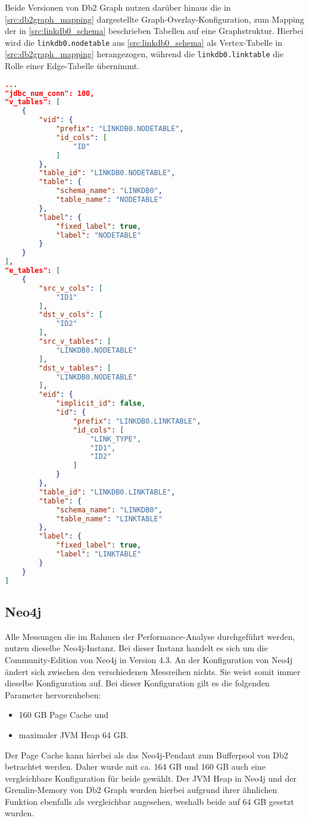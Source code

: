 Beide Versionen von Db2 Graph nutzen darüber hinaus die in \autoref{src:db2graph_mapping} dargestellte Graph-Overlay-Konfiguration, zum Mapping der in \autoref{src:linkdb0_schema} beschrieben Tabellen auf eine Graphstruktur. Hierbei wird die \texttt{linkdb0.nodetable} aus \autoref{src:linkdb0_schema} als Vertex-Tabelle in \autoref{src:db2graph_mapping} herangezogen, während die \texttt{linkdb0.linktable} die Rolle einer Edge-Tabelle übernimmt. 
\begin{lstlisting}[label=src:db2graph_mapping,caption={Graph-Overlay-Konfiguration Db2 Graph},language=json]
...
"jdbc_num_conn": 100,
"v_tables": [
    {
        "vid": {
            "prefix": "LINKDB0.NODETABLE",
            "id_cols": [
                "ID"
            ]
        },
        "table_id": "LINKDB0.NODETABLE",
        "table": {
            "schema_name": "LINKDB0",
            "table_name": "NODETABLE"
        },
        "label": {
            "fixed_label": true,
            "label": "NODETABLE"
        }
    }
],
"e_tables": [
    {
        "src_v_cols": [
            "ID1"
        ],
        "dst_v_cols": [
            "ID2"
        ],
        "src_v_tables": [
            "LINKDB0.NODETABLE"
        ],
        "dst_v_tables": [
            "LINKDB0.NODETABLE"
        ],
        "eid": {
            "implicit_id": false,
            "id": {
                "prefix": "LINKDB0.LINKTABLE",
                "id_cols": [
                    "LINK_TYPE",
                    "ID1",
                    "ID2"
                ]
            }
        },
        "table_id": "LINKDB0.LINKTABLE",
        "table": {
            "schema_name": "LINKDB0",
            "table_name": "LINKTABLE"
        },
        "label": {
            "fixed_label": true,
            "label": "LINKTABLE"
        }
    }
]
\end{lstlisting}

\subsection{Neo4j}
Alle Messungen die im Rahmen der Performance-Analyse durchgeführt werden, nutzen dieselbe Neo4j-Instanz. Bei dieser Instanz handelt es sich um die Community-Edition von Neo4j in Version 4.3. An der Konfiguration von Neo4j ändert sich zwischen den verschiedenen Messreihen nichts. Sie weist somit immer dieselbe Konfiguration auf. Bei dieser Konfiguration gilt es die folgenden Parameter hervorzuheben: 
\begin{itemize}
    \item 160 GB Page Cache und
    \item maximaler JVM Heap 64 GB.
\end{itemize}
Der Page Cache kann hierbei als das Neo4j-Pendant zum Bufferpool von Db2 betrachtet werden. Daher wurde mit ca. 164 GB und 160 GB auch eine vergleichbare Konfiguration für beide gewählt. Der JVM Heap in Neo4j und der Gremlin-Memory von Db2 Graph wurden hierbei aufgrund ihrer ähnlichen Funktion ebenfalls als vergleichbar angesehen, weshalb beide auf 64 GB gesetzt wurden.

